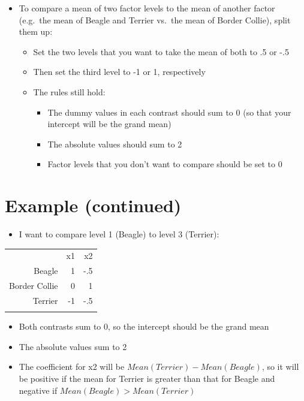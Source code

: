 \documentclass[]{article}
\begin{document}
\begin{itemize}
\itemsep1pt\parskip0pt
\item
  To compare a mean of two factor levels to the mean of another factor
  (e.g.~the mean of Beagle and Terrier vs.~the mean of Border Collie),
  split them up:

  \begin{itemize}
  \itemsep1pt\parskip0pt
  \item
    Set the two levels that you want to take the mean of both to .5 or
    -.5
  \item
    Then set the third level to -1 or 1, respectively
  \item
    The rules still hold:

    \begin{itemize}
    \itemsep1pt\parskip0pt
    \item
      The dummy values in each contrast should sum to 0 (so that your
      intercept will be the grand mean)
    \item
      The absolute values should sum to 2
    \item
      Factor levels that you don't want to compare should be set to 0
    \end{itemize}
  \end{itemize}
\end{itemize}

\section{Example (continued)}\label{example-continued}

\begin{itemize}
\itemsep1pt\parskip0pt
\item
  I want to compare level 1 (Beagle) to level 3 (Terrier):
\end{itemize}

\begin{longtable}[c]{@{}rrr@{}}
\toprule\addlinespace
& x1 & x2
\\\addlinespace
\midrule\endhead
Beagle & 1 & -.5
\\\addlinespace
Border Collie & 0 & 1
\\\addlinespace
Terrier & -1 & -.5
\\\addlinespace
\bottomrule
\end{longtable}

\begin{itemize}
\itemsep1pt\parskip0pt
\item
  Both contrasts sum to 0, so the intercept should be the grand mean
\item
  The absolute values sum to 2
\item
  The coefficient for x2 will be $Mean(Terrier) - Mean(Beagle)$, so it
  will be positive if the mean for Terrier is greater than that for
  Beagle and negative if $Mean(Beagle) > Mean(Terrier)$
\end{itemize}
\end{document}
